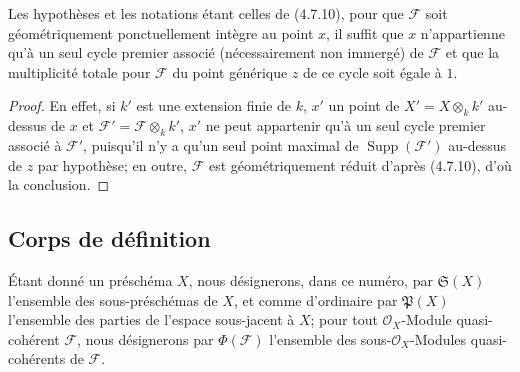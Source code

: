 \begin{proposition}[4.7.13]
\label{IV.2.4.7.13-fr}
Les hypothèses et les notations étant celles de (4.7.10), pour que
$\mathscr F$ soit géométriquement ponctuellement intègre au point $x$, il
suffit que $x$ n'appartienne qu'à un seul cycle premier associé
(nécessairement non immergé) de $\mathscr F$ et que la multiplicité totale
pour $\mathscr F$ du point générique $z$ de ce cycle soit égale à $1$.
\end{proposition}

\begin{proof}
En effet, si $k'$ est une extension finie de $k$, $x'$ un point de
$X'=X\otimes_k k'$ au-dessus de $x$ et
$\mathscr F'=\mathscr F\otimes_k k'$, $x'$ ne peut appartenir qu'à un seul
cycle premier associé à $\mathscr F'$, puisqu'il n'y a qu'un seul point
maximal de $\operatorname{Supp}(\mathscr F')$ au-dessus de $z$ par hypothèse;
en outre, $\mathscr F$ est géométriquement réduit d'après (4.7.10), d'où la
conclusion.
\end{proof}
\subsection{Corps de définition}
\label{subsection:IV.4.8-fr}

\begin{env}[4.8.1]
\label{IV.2.4.8.1-fr}
Étant donné un préschéma $X$, nous désignerons, dans ce numéro, par
$\mathfrak S(X)$ l'ensemble des sous-préschémas de $X$, et comme d'ordinaire
par $\mathfrak P(X)$ l'ensemble des parties de l'espace sous-jacent à $X$;
pour tout $\mathcal O_X$-Module quasi-cohérent $\mathscr F$, nous désignerons
par $\Phi(\mathscr F)$ l'ensemble des sous-$\mathcal O_X$-Modules
quasi-cohérents de $\mathscr F$.
\end{env}

